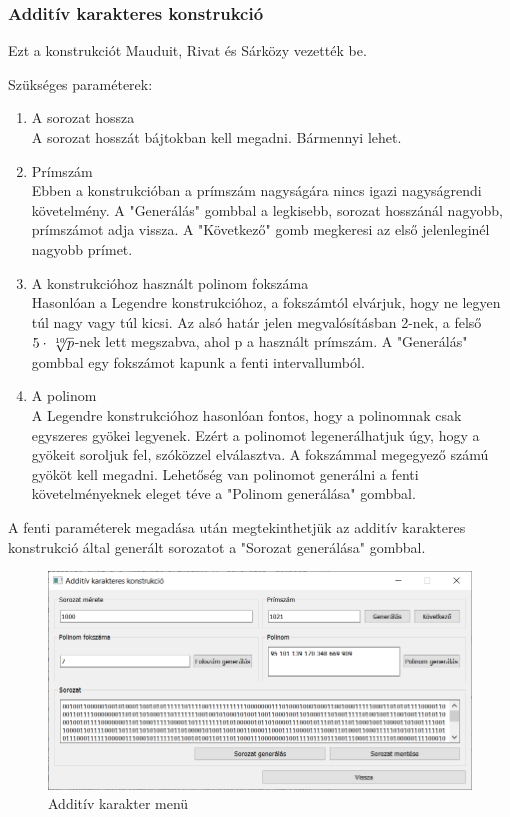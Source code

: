 \documentclass[hidelinks, 12pt]{article}
\begin{document}
	\subsubsection{Additív karakteres konstrukció}
	Ezt a konstrukciót Mauduit, Rivat és Sárközy vezették be. \cite{additive} \par
	Szükséges paraméterek:
	\begin{enumerate}
		\bfseries \item A sorozat hossza \\
		\normalfont A sorozat hosszát bájtokban kell megadni. Bármennyi lehet. \\
		\bfseries \item Prímszám \\
		\normalfont Ebben a konstrukcióban a prímszám nagyságára nincs igazi nagyságrendi követelmény. A "Generálás" gombbal a legkisebb, sorozat hosszánál nagyobb, prímszámot adja vissza. A "Következő" gomb megkeresi az első jelenleginél nagyobb prímet.
		\bfseries \item A konstrukcióhoz használt polinom fokszáma \\
		\normalfont Hasonlóan a Legendre konstrukcióhoz, a fokszámtól elvárjuk, hogy ne legyen túl nagy vagy túl kicsi. Az alsó határ jelen megvalósításban 2-nek, a felső $5\cdot\sqrt[\leftroot{-2}\uproot{2}10]{p}$-nek lett megszabva, ahol p a használt prímszám. A "Generálás" gombbal egy fokszámot kapunk a fenti intervallumból.
		\bfseries \item A polinom \\
		\normalfont A Legendre konstrukcióhoz hasonlóan fontos, hogy a polinomnak csak egyszeres gyökei legyenek. Ezért a polinomot legenerálhatjuk úgy, hogy a gyökeit soroljuk fel, szóközzel elválasztva. A fokszámmal megegyező számú gyököt kell megadni. Lehetőség van polinomot generálni a fenti követelményeknek eleget téve a "Polinom generálása" gombbal.
	\end{enumerate}
	A fenti paraméterek megadása után megtekinthetjük az additív karakteres konstrukció által generált sorozatot a "Sorozat generálása" gombbal.
	\begin{figure}[h]
		\centering
		\begin{minipage}{\textwidth} %
			\includegraphics[width=\textwidth]{additivemenu.png}
		\end{minipage}
		\caption{Additív karakter menü}
	\end{figure}
\end{document}
